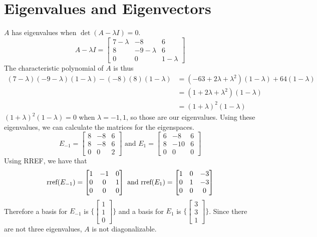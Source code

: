 \section{Eigenvalues and Eigenvectors}
$A$ has eigenvalues when $\det(A-\lambda I) = 0$.
\[
A-\lambda I =
\begin{bmatrix}
    7-\lambda & -8 & 6 \\
    8 & -9-\lambda & 6 \\
    0 & 0 & 1-\lambda
\end{bmatrix}
\]
The characteristic polynomial of $A$ is thus
\begin{align}
    (7-\lambda)(-9-\lambda)(1-\lambda) - (-8)(8)(1-\lambda)
    &=(-63+2\lambda+\lambda^2)(1-\lambda) + 64(1-\lambda)\\
    &=(1+2\lambda+\lambda^2)(1-\lambda)\\
    &=(1+\lambda)^2(1-\lambda)
\end{align}
$(1+\lambda)^2(1-\lambda) = 0$ when $\lambda = -1, 1$, so those are our eigenvalues.
Using these eigenvalues, we can calculate the matrices for the eigenspaces.
\[
E_{-1} =
\begin{bmatrix}
    8 & -8 & 6 \\
    8 & -8 & 6 \\
    0 & 0 & 2
\end{bmatrix}
\text{  and  }
E_{1} =
\begin{bmatrix}
    6 & -8 & 6 \\
    8 & -10 & 6 \\
    0 & 0 & 0
\end{bmatrix}
\]
Using RREF, we have that
\[
\text{rref}(E_{-1}) =
\begin{bmatrix}
    1 & -1 & 0 \\
    0 & 0 & 1 \\
    0 & 0 & 0
\end{bmatrix}
\text{  and  }
\text{rref}(E_{1}) =
\begin{bmatrix}
    1 & 0 & -3 \\
    0 & 1 & -3 \\
    0 & 0 & 0
\end{bmatrix}
\]
Therefore a basis for $E_{-1}$ is $\{\begin{bmatrix} 1 \\ 1 \\ 0 \end{bmatrix}\}$ and
a basis for $E_1$ is $\{\begin{bmatrix} 3 \\ 3 \\ 1 \end{bmatrix}\}$.
Since there are not three eigenvalues, $A$ is not diagonalizable.
